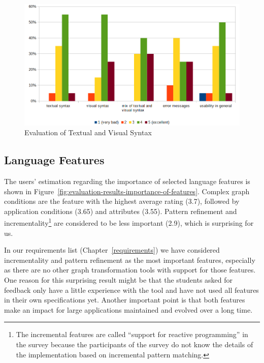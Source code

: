 \begin{figure}[h!]
	\centering
	\includegraphics[width=\linewidth]{../common/figures/evaluation-results-syntax}
	\caption{Evaluation of Textual and Visual Syntax}
	\label{fig:evaluation-results-syntax}
\end{figure}

\subsection{Language Features}
\label{evaluation-features}
The users' estimation regarding the importance of selected language features is shown in Figure~\ref{fig:evaluation-results-importance-of-features}.
Complex graph conditions are the feature with the highest average rating (3.7), followed by application conditions (3.65) and attributes (3.55).
Pattern refinement and incrementality\footnote{The incremental features are called ``support for reactive programming'' in the survey because the participants of the survey do not know the details of the implementation based on incremental pattern matching.} are considered to be less important (2.9), which is surprising for us.

In our requirements list (Chapter~\ref{requirements}) we have considered incrementality and pattern refinement as the most important features, especially as there are no other graph transformation tools with support for those features.
One reason for this surprising result might be that the students asked for feedback only have a little experience with the tool and have not used all features in their own specifications yet.
Another important point is that both features make an impact for large applications maintained and evolved over a long time.

